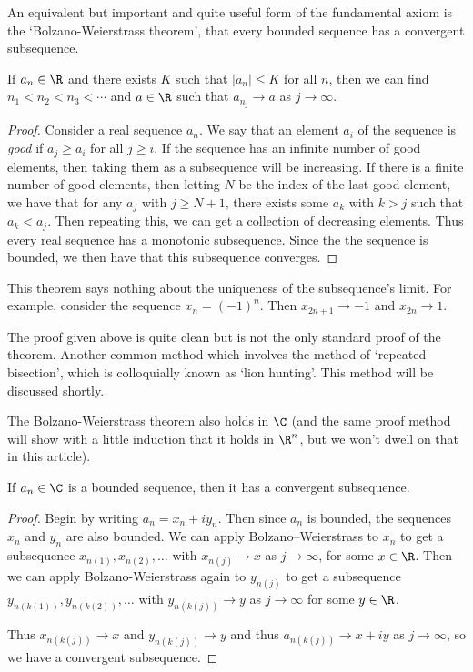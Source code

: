 An equivalent but important and quite useful form of the fundamental axiom is the `Bolzano-Weierstrass theorem', that every bounded sequence has a convergent subsequence.

\begin{theorem}\label{thm:bolzano}
	If $a_n \in \R$ and there exists $K$ such that $|a_n| \leq K$ for all $n$, then we can find $n_1 < n_2 < n_3 < \cdots$ and $a \in \R$ such that $a_{n_j} \rightarrow a$ as $j \rightarrow \infty$.
\end{theorem}
\begin{proof}
Consider a real sequence $a_{n}$. We say that an element $a_{i}$ of the sequence is \emph{good} if $a_{j} \geq a_{i}$ for all $j \geq i$. If the sequence has an infinite number of good elements, then taking them as a subsequence will be increasing. If there is a finite number of good elements, then letting $N$ be the index of the last good element, we have that for any $a_{j}$ with $j \geq N+1$, there exists some $a_{k}$ with $k>j$ such that $a_{k}<a_{j}$. Then repeating this, we can get a collection of decreasing elements. Thus every real sequence has a monotonic subsequence.
Since the the sequence is bounded, we then have that this subsequence converges.
\end{proof}

\begin{remark}
	This theorem says nothing about the uniqueness of the subsequence's limit. For example, consider the sequence $x_n = (-1)^n$. Then $x_{2n + 1} \rightarrow -1$ and $x_{2n} \rightarrow 1$.
\end{remark}

The proof given above is quite clean but is not the only standard proof of the theorem. Another common method which involves the method of `repeated bisection', which is colloquially known as `lion hunting'. This method will be discussed shortly. 

The Bolzano-Weierstrass theorem also holds in $\C$ (and the same proof method will show with a little induction that it holds in $\R^n$, but we won't dwell on that in this article). 

\begin{theorem}
	If $a_n \in \C$ is a bounded sequence, then it has a convergent subsequence.
\end{theorem}
\begin{proof}
	Begin by writing $a_n = x_n + i y_n$. Then since $a_n$ is bounded, the sequences $x_n$ and $y_n$ are also bounded.
	We can apply Bolzano–Weierstrass to $x_n$ to get a subsequence $x_{n(1)}, x_{n(2)}, \dots$ with $x_{n(j)} \rightarrow x$ as $j \rightarrow \infty$, for some $x \in \R$.
	Then we can apply Bolzano-Weierstrass again to $y_{n(j)}$ to get a subsequence $y_{n(k(1))}, y_{n(k(2))}, \dots$ with $y_{n(k(j))} \rightarrow y$ as $j \rightarrow \infty$ for some $y \in \R$.

	Thus $x_{n(k(j))} \rightarrow x$ and $y_{n(k(j))} \rightarrow y$ and thus $a_{n(k(j))} \rightarrow x + iy$ as $j \rightarrow \infty$, so we have a convergent subsequence.
\end{proof}

